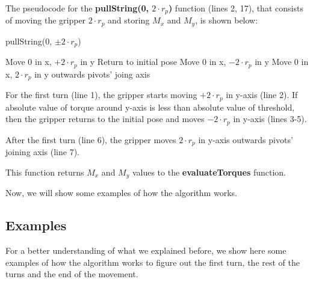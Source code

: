 The pseudocode for the \textbf{pullString(0, $2 \cdot r_{p}$)} function (lines 2, 17), that consists of moving the gripper $2 \cdot r_{p}$ and storing $M_{x}$ and $M_{y}$, is shown below:
\begin{algorithm}
	\caption{pullString(0, $\pm2 \cdot r_{p}$)}\label{euclid}
	\begin{algorithmic}[1]
		\State Move 0 in x, $+2 \cdot r_{p}$ in y
		\State Return to initial pose
		\State Move 0 in x, $-2 \cdot r_{p}$ in y
		\EndIf
		\Else
		\State Move 0 in x, $2 \cdot r_{p}$ in y outwards pivots' joing axis
		\EndIf
	\end{algorithmic}
\end{algorithm}

For the first turn (line 1), the gripper starts moving $+2 \cdot r_{p}$ in y-axis (line 2). If absolute value of torque around y-axis is less than absolute value of threshold, then the gripper returns to the initial pose and moves $-2 \cdot r_{p}$ in y-axis (lines 3-5).

After the first turn (line 6), the gripper moves $2 \cdot r_{p}$ in y-axis outwards pivots' joining axis (line 7). 

This function returns $M_{x}$ and $M_{y}$ values to the \textbf{evaluateTorques} function.

Now, we will show some examples of how the algorithm works.

\subsection{Examples}
For a better understanding of what we explained before, we show here some examples of how the algorithm works to figure out the first turn, the rest of the turns and the end of the movement. 

